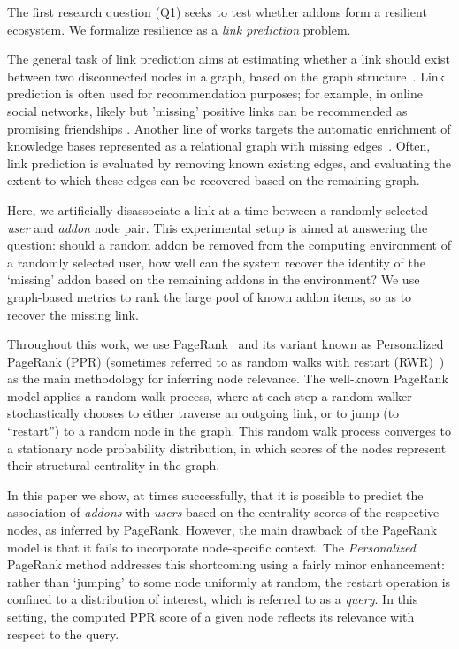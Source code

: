 \documentclass[ijoc,nonblindrev]{informs3} %
\numberwithin{equation}{subsection}
\begin{document}
The first research question (Q1) seeks to test whether addons form a resilient ecosystem. We formalize resilience as a \emph{link prediction} problem. 

The general task of link prediction aims at estimating whether a link should exist between two disconnected nodes in a graph, based on the graph structure~\citep{henzinger2000link,getoor2005link,lu2011link,sunWSDM12}. Link prediction is often used for recommendation purposes; for example, in online social networks, likely but 'missing' positive links can be recommended as promising friendships \citep{leskovec2010predicting}. Another line of works targets the automatic enrichment of knowledge bases represented as a relational graph with missing edges~\citep{lao2010relational}. Often, link prediction is evaluated by removing known existing edges, and evaluating the extent to which these edges can be recovered based on the remaining graph.

Here, we artificially disassociate a link at a time between a randomly selected {\it user} and {\it addon} node pair. This experimental setup is aimed at answering the question: should a random addon be removed from the computing environment of a randomly selected user, how well can the system recover the identity of the `missing' addon based on the remaining addons in the environment? We use graph-based metrics to rank the large pool of known addon items, so as to recover the missing link. 

Throughout this work, we use PageRank~\citep{page1999pagerank,franceschet2011pagerank} and its variant known as Personalized PageRank (PPR) (sometimes referred to as random walks with restart (RWR)~\citep{tongKAIS08}) as the main methodology for inferring node relevance. The well-known PageRank model applies a random walk process, where at each step a random walker stochastically chooses to either traverse an outgoing link, or to jump (to ``restart'') to a random node in the graph. This random walk process converges to a stationary node probability distribution, in which scores of the nodes represent their structural centrality in the graph. 

In this paper we show, at times successfully, that it is possible to predict the association of {\it addons} with {\it users} based on the centrality scores of the respective nodes, as inferred by PageRank. However, the main drawback of the PageRank model is that it fails to incorporate node-specific context. The {\it Personalized} PageRank method addresses this shortcoming using a fairly minor enhancement: rather than `jumping' to some node uniformly at random, the restart operation is confined to a distribution of interest, which is referred to as a {\it query}. In this setting, the computed PPR score of a given node reflects its relevance with respect to the query.
\end{document}

